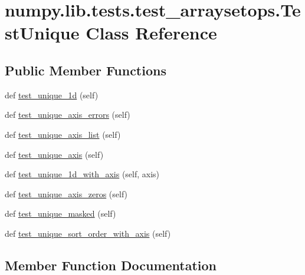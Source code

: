 \hypertarget{classnumpy_1_1lib_1_1tests_1_1test__arraysetops_1_1TestUnique}{}\section{numpy.\+lib.\+tests.\+test\+\_\+arraysetops.\+Test\+Unique Class Reference}
\label{classnumpy_1_1lib_1_1tests_1_1test__arraysetops_1_1TestUnique}
\subsection*{Public Member Functions}
\begin{DoxyCompactItemize}
\item 
def \hyperlink{classnumpy_1_1lib_1_1tests_1_1test__arraysetops_1_1TestUnique_abf979fca0d68fd4269d0de17c23a734a}{test\+\_\+unique\+\_\+1d} (self)
\item 
def \hyperlink{classnumpy_1_1lib_1_1tests_1_1test__arraysetops_1_1TestUnique_ac9a050c39f6b633ba3ca4d3243fa5bad}{test\+\_\+unique\+\_\+axis\+\_\+errors} (self)
\item 
def \hyperlink{classnumpy_1_1lib_1_1tests_1_1test__arraysetops_1_1TestUnique_a5b849b3826d1381508739ed74607a8d7}{test\+\_\+unique\+\_\+axis\+\_\+list} (self)
\item 
def \hyperlink{classnumpy_1_1lib_1_1tests_1_1test__arraysetops_1_1TestUnique_a5af8c437d0770e6d31aa4cf86ae340a8}{test\+\_\+unique\+\_\+axis} (self)
\item 
def \hyperlink{classnumpy_1_1lib_1_1tests_1_1test__arraysetops_1_1TestUnique_a46af7c35385c78115be89652952af67a}{test\+\_\+unique\+\_\+1d\+\_\+with\+\_\+axis} (self, axis)
\item 
def \hyperlink{classnumpy_1_1lib_1_1tests_1_1test__arraysetops_1_1TestUnique_a566d00e300e42c2306d1b0b6cb23ca05}{test\+\_\+unique\+\_\+axis\+\_\+zeros} (self)
\item 
def \hyperlink{classnumpy_1_1lib_1_1tests_1_1test__arraysetops_1_1TestUnique_a3ddeb5188d79c63610b6180dbb0a4a52}{test\+\_\+unique\+\_\+masked} (self)
\item 
def \hyperlink{classnumpy_1_1lib_1_1tests_1_1test__arraysetops_1_1TestUnique_a4a6877f075992e391a8a4d8f7c46f851}{test\+\_\+unique\+\_\+sort\+\_\+order\+\_\+with\+\_\+axis} (self)
\end{DoxyCompactItemize}


\subsection{Member Function Documentation}
\mbox{\label{classnumpy_1_1lib_1_1tests_1_1test__arraysetops_1_1TestUnique_abf979fca0d68fd4269d0de17c23a734a}} 

